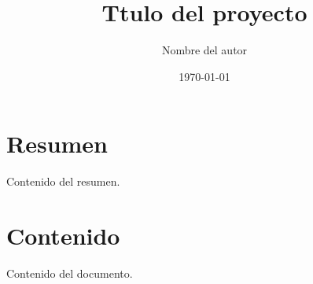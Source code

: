﻿\documentclass[12pt]{article}
\title{Ttulo del proyecto}
\author{Nombre del autor}
\date{\today}
\begin{document}
\maketitle

\section{Resumen}

Contenido del resumen.

\section{Contenido}

Contenido del documento.
\end{document}
